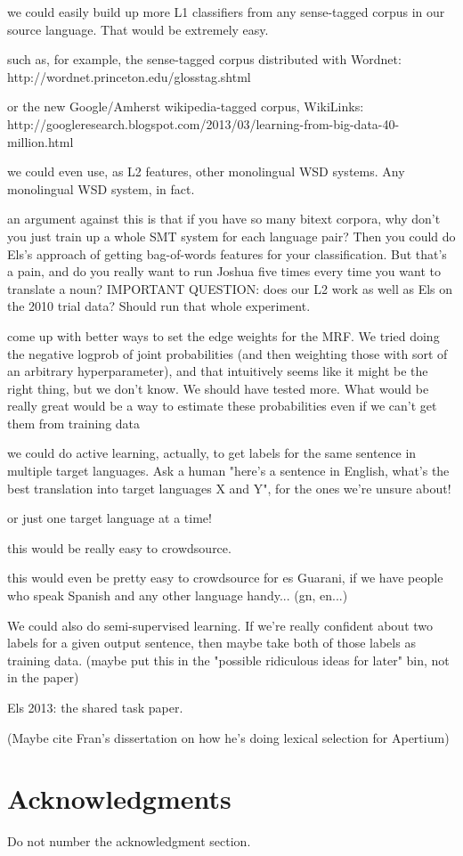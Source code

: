 \documentclass[11pt,letterpaper]{article}
\begin{document}
 we could easily build up more L1 classifiers from any sense-tagged corpus in
our source language. That would be extremely easy.

such as, for example, the sense-tagged corpus distributed with Wordnet:
http://wordnet.princeton.edu/glosstag.shtml


or the new Google/Amherst wikipedia-tagged corpus, WikiLinks:
http://googleresearch.blogspot.com/2013/03/learning-from-big-data-40-million.html


we could even use, as L2 features, other monolingual WSD systems. Any
monolingual WSD system, in fact.


an argument against this is that if you have so many bitext corpora, why
don't you just train up a whole SMT system for each language pair? Then you
could do Els's approach of getting bag-of-words features for your
classification. But that's a pain, and do you really want to run Joshua five
times every time you want to translate a noun? IMPORTANT QUESTION: does our L2
work as well as Els on the 2010 trial data? Should run that whole experiment.


come up with better ways to set the edge weights for the MRF. We tried doing
the negative logprob of joint probabilities (and then weighting those with
sort of an arbitrary hyperparameter), and that intuitively seems like it might
be the right thing, but we don't know. We should have tested more. What would
be really great would be a way to estimate these probabilities even if we
can't get them from training data

we could do active learning, actually, to get labels for the same sentence
in multiple target languages. Ask a human "here's a sentence in English, what's
the best translation into target languages X and Y", for the ones we're unsure
about!

or just one target language at a time!

this would be really easy to crowdsource.

this would even be pretty easy to crowdsource for es Guarani, if we have
people who speak Spanish and any other language handy... (gn, en...)

We could also do semi-supervised learning. If we're really confident about
two labels for a given output sentence, then maybe take both of those labels as
training data. (maybe put this in the "possible ridiculous ideas for later"
bin, not in the paper)


Els 2013: the shared task paper.

(Maybe cite Fran's dissertation on how he's doing lexical selection for
Apertium)

\cite{task10}

\section*{Acknowledgments}

Do not number the acknowledgment section.


{}
\end{document}
